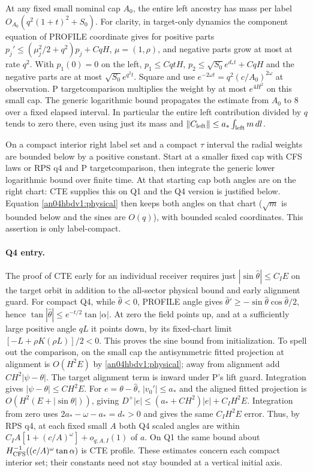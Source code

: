 \documentclass[11pt]{article}
\newcommand{\dd}{\,d}
\begin{document}
At any fixed small nominal cap $A_0$, the entire left ancestry has
mass per label $O_{A_0}(q^2(1+t)^2+S_0)$.
For clarity, in target-only dynamics the component equation of
PROFILE coordinate gives for positive parts
$p_j'\le(\mu_j^2/2+q^2)p_j+CqH$, $\mu=(1,\rho)$, and negative
parts grow at most at rate $q^2$. With $p_1(0)=0$ on the left,
$p_1\le CqtH$, $p_2\le\sqrt{S_0}e^{d_*t}+CqH$ and the negative
parts are at most $\sqrt{S_0}e^{q^2t}$. Square and use
$e^{-2\omega t}=q^2(c/A_0)^{2\omega}$ at observation.
P targetcomparison multiplies the weight by at most $e^{4H^2}$
on this small cap. The generic logarithmic bound propagates the
estimate from $A_0$ to $8$ over a fixed elapsed interval. In
particular the entire left contribution divided by $q$ tends to
zero there, even using just its mass and $\|C_{\rm left}\|\le
a_*\int_{\rm left}m\dd l$.

On a compact interior right label set and a compact $\tau$ interval
the radial weights are bounded below by a positive constant. Start at
a smaller fixed cap with CFS laws or RPS q4 and P targetcomparison,
then integrate the generic lower logarithmic bound over finite time.
At that starting cap both angles are on the right chart: CTE supplies
this on Q1 and the Q4 version is justified below. Equation
\eqref{an04hbdv1:physical} then keeps both angles on that chart
($\sqrt m$ is bounded below and the sines are $O(q)$), with
bounded scaled coordinates. This assertion is only label-compact.

\paragraph{Q4 entry.}
The proof of CTE early for an individual receiver requires just
$|\sin\widehat\theta|\le C_I E$ on the target orbit in addition to
the all-sector physical bound and early alignment guard. For compact
Q4, while $\widehat\theta<0$, PROFILE angle gives
$\widehat\theta'\ge-\sin\widehat\theta\cos\widehat\theta/2$,
hence $\tan|\widehat\theta|\le e^{-t/2}\tan|\alpha|$.
At zero the field points up, and at a sufficiently large positive
angle $qL$ it points down, by its fixed-chart limit
$[-L+\rho K(\rho L)]/2<0$. This proves the sine bound from
initialization. To spell out the comparison, on the small cap the
antisymmetric fitted projection at alignment is $O(H^2E)$ by
\eqref{an04hbdv1:physical}; away from alignment add
$CH^2|\psi-\theta|$. The target alignment term is inward under
P's lift guard. Integration gives $|\psi-\theta|\le CH^2E$.
For $e=\theta-\widehat\theta$, $|v_0'|\le a_*$ and the aligned
fitted projection is $O(H^2(E+|\sin\theta|))$, giving
$D^+|e|\le(a_*+CH^2)|e|+C_IH^2E$. Integration from zero uses
$2a_*-\omega-a_*=d_*>0$ and gives the same $C_IH^2E$ error.
Thus, by RPS q4, at each fixed small $A$ both Q4 scaled angles
are within $C_I A[1+(c/A)^\omega]+o_{q;A,I}(1)$ of $a$.
On Q1 the same bound about $H_{\rm CFS}^{-1}((c/A)^\omega\tan\alpha)$
is CTE profile. These estimates concern each compact interior set;
their constants need not stay bounded at a vertical initial axis.
\end{document}
